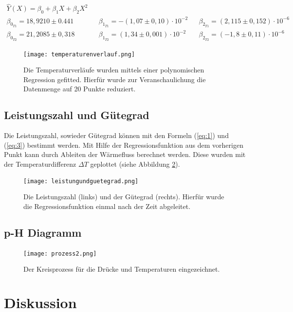 \documentclass{article}
\begin{document}
\begin{align} \label{eq:5}
    \hat{Y}(X) = \beta_0 + \beta_1 X + \beta_2 X^2 \\
    \beta_{0_{T1}} = 18,9210 \pm 0.441 && \beta_{1_{T1}} = -(1,07 \pm 0,10)\cdot 10^{-2} && \beta_{2_{T1}} = (2,115 \pm 0,152) \cdot 10^{-6} \\
    \beta_{0_{T2}} = 21,2085 \pm 0,318 && \beta_{1_{T2}} = (1,34 \pm 0,001) \cdot 10^{-2} && \beta_{2_{T2}} = (-1,8 \pm 0,11) \cdot 10^{-6}
\end{align}

\begin{figure}[!htbp]
\begin{center} \texttt{[image: temperaturenverlauf.png]}  
\caption{
Die Temperaturverläufe wurden mittels einer polynomischen Regression gefitted. Hierfür wurde zur Veranschaulichung die Datenmenge auf 20 Punkte reduziert.}
\label{temperaturfit}
\end{center}
\end{figure}
%
\subsection{Leistungszahl und Gütegrad}
Die Leistungszahl, sowieder Gütegrad können mit den Formeln (\ref{eq:1}) und (\ref{eq:3}) bestimmt werden. Mit Hilfe der Regressionsfunktion aus dem vorherigen Punkt kann durch Ableiten der Wärmefluss berechnet werden. Diese wurden mit der Temperaturdifferenz $\Delta T$ geplottet (siehe Abbildung \ref{leistungsguete}).
\begin{figure}[!htbp]
\begin{center} \texttt{[image: leistungundguetegrad.png]}  
\caption{
Die Leistungszahl (links) und der Gütegrad (rechts). Hierfür wurde die Regressionsfunktion einmal nach der Zeit abgeleitet.}
\label{leistungsguete}
\end{center}
\end{figure}
%
\subsection{p-H Diagramm}
\begin{figure}[!htbp]
\begin{center} \texttt{[image: prozess2.png]}  
\caption{
Der Kreisprozess für die Drücke und Temperaturen eingezeichnet.}
\label{prozess}
\end{center}
\end{figure}
%
\newpage
\section{Diskussion}
\end{document}
